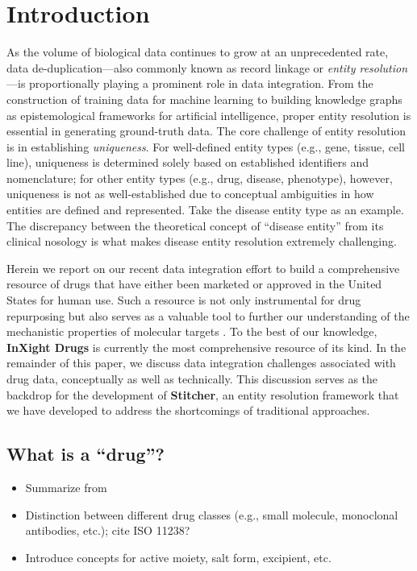 \documentclass{bioinfo}
\begin{document}
\section{Introduction}
As the volume of biological data continues to grow at an unprecedented rate, data de-duplication---also commonly known as record linkage or \emph{entity resolution}---is proportionally playing a prominent role in data integration. From the construction of training data for machine learning to building knowledge graphs as epistemological frameworks for artificial intelligence, proper entity resolution is essential in generating ground-truth data. The core challenge of entity resolution is in establishing \emph{uniqueness}. For well-defined entity types (e.g., gene, tissue, cell line), uniqueness is determined solely based on established identifiers and nomenclature; for other entity types (e.g., drug, disease, phenotype), however, uniqueness is not as well-established due to conceptual ambiguities in how entities are defined and represented. Take the disease entity type as an example. The discrepancy between the theoretical concept of ``disease entity'' from its clinical nosology \citep{Hucklenbroich14} is what makes disease entity resolution extremely challenging.

Herein we report on our recent data integration effort to build a comprehensive resource of drugs that have either been marketed or approved in the United States for human use. Such a resource is not only instrumental for drug repurposing but also serves as a valuable tool to further our understanding of the mechanistic properties of molecular targets \citep{Huang2019}. To the best of our knowledge, \textbf{InXight Drugs} is currently the most comprehensive resource of its kind. In the remainder of this paper, we discuss data integration challenges associated with drug data, conceptually as well as technically. This discussion serves as the backdrop for the development of \textbf{Stitcher}, an entity resolution framework that we have developed to address the shortcomings of traditional approaches.

\subsection{What is a ``drug''?}
\begin{itemize}
\item Summarize from \citep{Huang2011}
\item Distinction between different drug classes (e.g., small molecule, monoclonal antibodies, etc.); cite ISO 11238?
\item Introduce concepts for active moiety, salt form, excipient, etc.
\end{itemize}
\end{document}
